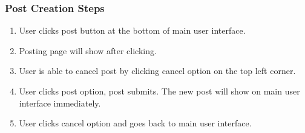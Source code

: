 \documentclass[12pt]{article}
\begin{document}
\subsubsection{Post Creation Steps}
\begin{enumerate}
  \item User clicks post button at the bottom of main user interface.
  \item Posting page will show after clicking.
  \item User is able to cancel post by clicking cancel option on the top left corner.
  \item User clicks post option, post submits. The new post will show on main user interface immediately.
  \item User clicks cancel option and goes back to main user interface.
\end{enumerate}
\end{document}
